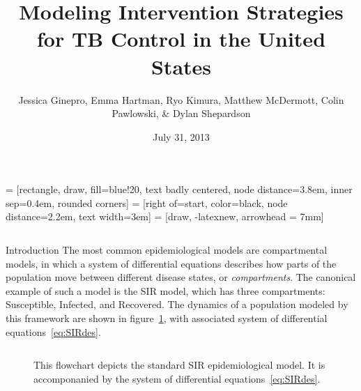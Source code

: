 \documentclass[final]{beamer}
\title{\huge Modeling Intervention Strategies for TB Control in the United States}
\author{Jessica Ginepro, Emma Hartman, Ryo Kimura, Matthew McDermott, Colin
        Pawlowski, \& Dylan Shepardson}
\institute[MHC]{Mathematical Modeling Group, Mount Holyoke College, South
                Hadley, MA, USA}
\date[July 31, 2013]{July 31, 2013}
\begin{document}
 = [rectangle, draw, fill=blue!20, text badly centered,
  node distance=3.8em, inner sep=0.4em, rounded corners]
 = [right of=start, color=black, node distance=2.2em,
text width=3em]
 = [draw, -latexnew, arrowhead = 7mm]


\begin{frame}
  \begin{columns}
    \begin{column}{.3\textwidth}
      \begin{block}{Introduction}
        The most common epidemiological models are compartmental models, in
        which a system of differential equations describes how parts of the
        population move between different disease states, or
        \emph{compartments}. The canonical example of such a model is the SIR
        model, which has three compartments: Susceptible, Infected, and
        Recovered. The dynamics of a population modeled by this framework are
        shown in figure~\ref{fig:SIRFlowchart}, with associated system of
        differential equations~\ref{eq:SIRdes}.
        \begin{block}{}
          \begin{column}{.39\textwidth}
            \begin{figure}[h]
              \begin{center}
              \end{center}
              \caption{This flowchart depicts the standard SIR epidemiological
                       model. It is accomponanied by the system of differential
                       equations~\ref{eq:SIRdes}.}
              \label{fig:SIRFlowchart}
            \end{figure}
          \end{column}
          \begin{column}{.39\textwidth}
            \begin{figure}[h]

\end{figure}
\end{column}
\end{block}
\end{block}
\end{column}
\end{columns}
\end{frame}
\end{document}
